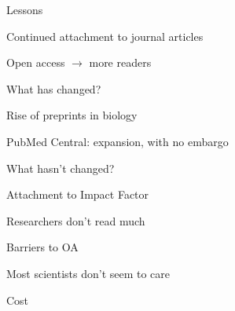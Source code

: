 \documentclass[aspectratio=169,12pt,t]{beamer}
\begin{document}
\begin{frame}{Lessons}

  \bbi
\item Continued attachment to journal articles
\item Open access $\longrightarrow$ more readers
  \ei

  \note{
  }
\end{frame}


\begin{frame}{What has changed?}

  \bbi
\item Rise of preprints in biology
\item PubMed Central: expansion, with no embargo
  \ei

  \note{
  }
\end{frame}


\begin{frame}{What hasn't changed?}

  \bbi
\item Attachment to Impact Factor
\item Researchers don't read much
  \ei

  \note{
  }
\end{frame}


\begin{frame}{Barriers to OA}

  \bbi
\item Most scientists don't seem to care
\item Cost
  \ei

  \note{
  }
\end{frame}
\end{document}
